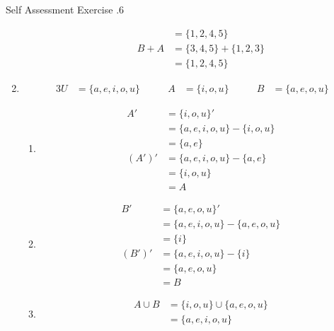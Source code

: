 \documentclass[../notes.tex]{subfiles}
\begin{document}
\begin{exercisebox}{Self Assessment Exercise \thechapter.6}
\begin{enumerate}
\begin{enumerate}[label=(\alph*)]
\begin{align*}
                  &= \{1, 2, 4 , 5\}\\
                  B + A &= \{3, 4, 5\} + \{1, 2, 3\}\\
                  &= \{1, 2, 4, 5\}
                \end{align*}
            \end{enumerate}
          \item \rule{0pt}{11pt} \vspace*{-25pt}
            \begin{alignat*}{3}
              U &= \{a, e, i, o, u\} \qquad & A &= \{i, o, u\} \qquad & B &= \{a, e, o, u\}
            \end{alignat*}
            \begin{enumerate}[label=(\alph*)]
              \item \rule{0pt}{11pt} \vspace*{-25pt}
                \begin{align*}
                  A' &= \{i, o, u\}'\\
                  &= \{a, e, i, o, u\} - \{i, o, u\}\\
                  &= \{a, e\}\\
                  \left(A'\right)' &= \{a, e, i, o, u\} - \{a, e\}\\
                  &= \{i, o, u\}\\
                  &= A
                \end{align*}
              \item \rule{0pt}{11pt} \vspace*{-25pt}
                \begin{align*}
                  B' &= \{a, e, o, u\}'\\
                  &= \{a, e, i, o, u\} - \{a, e, o, u\}\\
                  &= \{i\}\\
                  \left(B'\right)' &= \{a, e, i, o, u\} - \{i\}\\
                  &= \{a, e, o, u\}\\
                  &= B
                \end{align*}
              \item \rule{0pt}{11pt} \vspace*{-25pt}
                \begin{align*}
                  A \cup B &= \{i, o, u\} \cup \{a, e, o, u\}\\
                  &= \{a, e, i, o, u\}\\

\end{align*}
\end{enumerate}
\end{enumerate}
\end{exercisebox}
\end{document}
